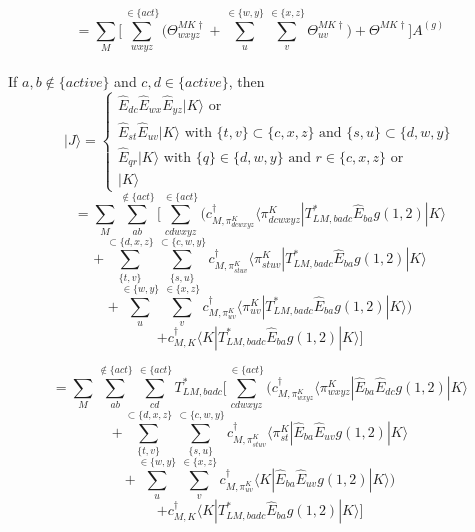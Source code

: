 \documentclass[12pt]{article}
\begin{document}
\begin{equation*}
= \sum_{M}\Bigg[\sum_{wxyz}^{\in\{act\}}\Bigg( 
 \Theta^{MK\dagger}_{wxyz}  + \sum_{u}^{\in\{w,y\}} \sum_{v}^{\in\{x,z\}}\Theta^{MK\dagger}_{uv}\Bigg) + \Theta^{MK\dagger} \Bigg] A^{(g)}
\end{equation*}
\\
\noindent If $a,b \notin \{active\} $ and $c,d \in \{active\}$, then
\begin{equation}
 |J\rangle =
\begin{cases}
 \hat{E}_{dc}\hat{E}_{wx}\hat{E}_{yz}|K\rangle \text{\ \ \ \ or \ \ }\\
 \hat{E}_{st}\hat{E}_{uv}|K\rangle \text{\ \ \ \ \ with \ \ } \{t,v\} \subset \{c,x,z\}\text{\ \ \ \ and \ \ } \{s,u\} \subset \{d,w,y\}\\
 \hat{E}_{qr}|K\rangle \text{\ \ \ \ \ \ \ \ \ with \ \ } \{q\} \in \{d,w,y\}\text{\ \ \ \ and \ \ } r \in \{c,x,z\}\text{\  \ \ or} \\
 |K\rangle
 \end{cases}
\end{equation}
\begin{equation*}
= \sum_{M}  \sum_{ab}^{\notin \{act\} } \Bigg[\sum_{cdwxyz}^{\in\{act\}}\Bigg( 
 c^{\dagger}_{M,\pi^{K}_{dcwxyz}}  \langle \pi^{K}_{dcwxyz}|T^{*}_{LM,badc}\hat{E}_{ba}g(1,2) |K  \rangle
\end{equation*}
\begin{equation*}
+ \sum_{\{t,v\}}^{\subset\{d,x,z\}}\sum_{\{s,u\}}^{\subset\{c,w,y\}}
 c^{\dagger}_{M,\pi^{K}_{stuv}}  \langle \pi^{K}_{stuv}|T^{*}_{LM,badc}\hat{E}_{ba}g(1,2) |K  \rangle 
\end{equation*}
\begin{equation*}
+ \sum_{u}^{\in\{w,y\}} \sum_{v}^{\in\{x,z\}} 
 c^{\dagger}_{M,\pi^{K}_{uv}}  \langle \pi^{K}_{uv}|T^{*}_{LM,badc}\hat{E}_{ba}g(1,2) |K  \rangle\Bigg)
\end{equation*}
\begin{equation*}
+ c^{\dagger}_{M,K}  \langle K|T^{*}_{LM,badc}\hat{E}_{ba}g(1,2) |K  \rangle\Bigg]
\end{equation*}

\begin{equation*}
= \sum_{M}  \sum_{ab}^{\notin \{act\} }\sum_{cd}^{\in\{act\}} T^{*}_{LM,badc} \Bigg[\sum_{cdwxyz}^{\in\{act\}}\Bigg( 
 c^{\dagger}_{M,\pi^{K}_{wxyz}}  \langle \pi^{K}_{wxyz}|\hat{E}_{ba}\hat{E}_{dc}g(1,2) |K  \rangle
\end{equation*}
\begin{equation*}
+ \sum_{\{t,v\}}^{\subset\{d,x,z\}}\sum_{\{s,u\}}^{\subset\{c,w,y\}}
 c^{\dagger}_{M,\pi^{K}_{stuv}}  \langle \pi^{K}_{st}|\hat{E}_{ba}\hat{E}_{uv}g(1,2) |K  \rangle 
\end{equation*}
\begin{equation*}
+ \sum_{u}^{\in\{w,y\}} \sum_{v}^{\in\{x,z\}} 
 c^{\dagger}_{M,\pi^{K}_{uv}}  \langle K|\hat{E}_{ba}\hat{E}_{uv}g(1,2) |K  \rangle\Bigg)
\end{equation*}
\begin{equation*}
+ c^{\dagger}_{M,K}  \langle K|T^{*}_{LM,badc}\hat{E}_{ba}g(1,2) |K  \rangle\Bigg]
\end{equation*}
\end{document}

